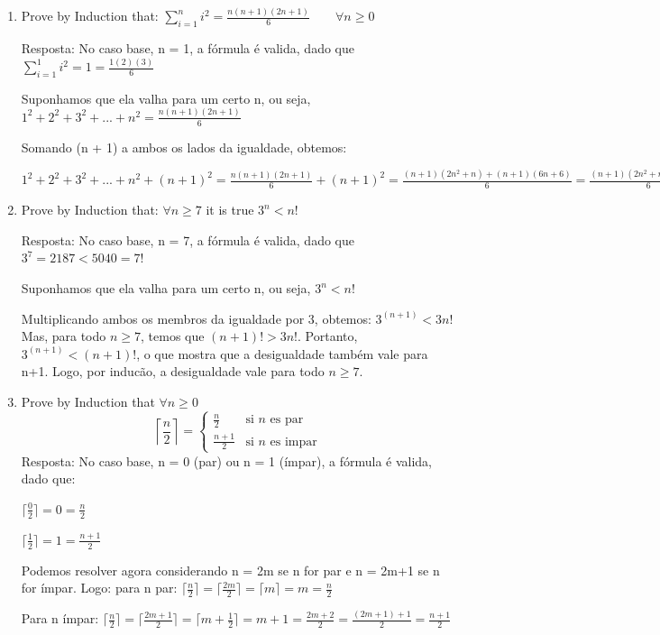 \documentclass{article}
\begin{document}
\begin{enumerate}
  \item Prove by Induction that:
  \( \sum_{i=1}^{n}i^2=\frac{n(n+1)(2n+1)}{6} \qquad\forall n \geq 0\)
  
  Resposta: No caso base, n = 1, a fórmula é valida, dado que \( \sum_{i=1}^{1}i^2=1 = \frac{1(2)(3)}{6} \)
  
  Suponhamos que ela valha para um certo n, ou seja, 
  \( 1^2+2^2+3^2+...+n^2 = \frac{n(n+1)(2n+1)}{6} \)

Somando (n + 1) a ambos os lados da igualdade, obtemos:

\( 1^2+2^2+3^2+...+n^2+(n+1)^2 = \frac{n(n+1)(2n+1)}{6}+(n+1)^2 =  \frac{(n+1)(2n^2+n) + (n+1)(6n+6)}{6} = \frac{(n+1)(2n^2+n+6n+6)}{6} = \frac{(n+1)(2n^2+7n+6)}{6} = \frac{(n+1)(n+2)(2n+3)}{6}\)

  \item Prove by Induction that:
  $\forall n \geq 7$ it is true $3^n<n!$
  
  Resposta: No caso base, n = 7, a fórmula é valida, dado que $3^7 = 2187 < 5040= 7!$
  
  Suponhamos que ela valha para um certo n, ou seja, 
  $3^n<n!$
  					
  Multiplicando ambos os membros da igualdade por 3, obtemos: \(3^{(n+1)}<3n!\)
  Mas, para todo $n \geq 7$, temos que $(n+1)! > 3n!$. Portanto, $3^{(n+1)}<(n+1)!$, o
  que mostra que a desigualdade também vale para n+1. Logo, por inducão, a desigualdade vale para todo $n \geq 7$.
  
  \item Prove by Induction that $\forall n \geq 0$
  \[
    \left \lceil\frac{n}{2} \right \rceil=
    \left\{
    \begin{array}{ll}
    \frac{n}{2}& \textrm{si $n$ es par}\\
    \frac{n+1}{2}& \textrm{si $n$ es impar}
    \end{array}
    \right.
  \]
	 Resposta: No caso base, n = 0 (par) ou n = 1 (ímpar), a fórmula é valida, dado que:
	 
	 $\lceil\frac{0}{2} \rceil= 0 = \frac{n}{2}$
	 
	 $\lceil\frac{1}{2} \rceil= 1 = \frac{n+1}{2}$
	
	Podemos resolver agora considerando n = 2m se n for par e n = 2m+1 se n for ímpar. Logo: para n par: $\lceil\frac{n}{2} \rceil= \lceil\frac{2m}{2} \rceil= \lceil m \rceil = m = \frac{n}{2}$
	
	Para n ímpar: $\lceil\frac{n}{2} \rceil= \lceil\frac{2m+1}{2} \rceil= \lceil m+\frac{1}{2} \rceil = m + 1= \frac{2m+2}{2} = \frac{(2m+1)+1}{2} = \frac{n+1}{2}$
	

\end{enumerate}
\end{document}
